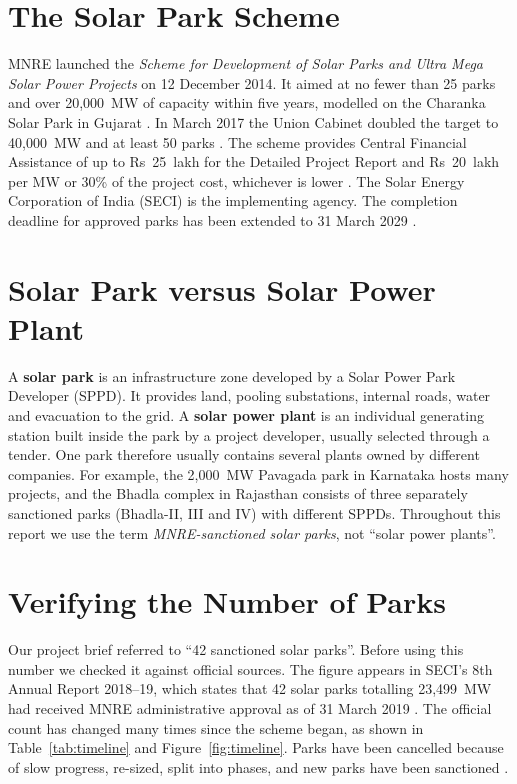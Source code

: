 \documentclass[12pt]{report}
\begin{document}
\section{The Solar Park Scheme}
\vspace{1mm}
MNRE launched the \textit{Scheme for Development of Solar Parks and Ultra Mega Solar Power Projects} on 12 December 2014. It aimed at no fewer than 25 parks and over 20,000~MW of capacity within five years, modelled on the Charanka Solar Park in Gujarat \cite{pib145542}. In March 2017 the Union Cabinet doubled the target to 40,000~MW and at least 50 parks \cite{pib158621}. The scheme provides Central Financial Assistance of up to Rs~25~lakh for the Detailed Project Report and Rs~20~lakh per MW or 30\% of the project cost, whichever is lower \cite{pib1809373}. The Solar Energy Corporation of India (SECI) is the implementing agency. The completion deadline for approved parks has been extended to 31 March 2029 \cite{pib2199729}.

\section{Solar Park versus Solar Power Plant}
\vspace{1mm}
A \textbf{solar park} is an infrastructure zone developed by a Solar Power Park Developer (SPPD). It provides land, pooling substations, internal roads, water and evacuation to the grid. A \textbf{solar power plant} is an individual generating station built inside the park by a project developer, usually selected through a tender. One park therefore usually contains several plants owned by different companies. For example, the 2,000~MW Pavagada park in Karnataka hosts many projects, and the Bhadla complex in Rajasthan consists of three separately sanctioned parks (Bhadla-II, III and IV) with different SPPDs. Throughout this report we use the term \textit{MNRE-sanctioned solar parks}, not ``solar power plants''.


\section{Verifying the Number of Parks}
\vspace{1mm}
Our project brief referred to ``42 sanctioned solar parks''. Before using this number we checked it against official sources. The figure appears in SECI's 8th Annual Report 2018--19, which states that 42 solar parks totalling 23,499~MW had received MNRE administrative approval as of 31 March 2019 \cite{seci2019}. The official count has changed many times since the scheme began, as shown in Table~\ref{tab:timeline} and Figure~\ref{fig:timeline}. Parks have been cancelled because of slow progress, re-sized, split into phases, and new parks have been sanctioned \cite{pib1907702, pib1909951}.
\end{document}
